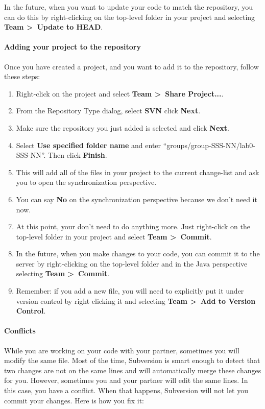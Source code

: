 \documentclass[10pt]{article}
\begin{document}
In the future, when you want to update your code to match the repository, you can do this by right-clicking on the top-level folder in your project and selecting \textbf{Team \textgreater~Update to HEAD}.

\paragraph{Adding your project to the repository} Once you have created a project, and you want to add it to the repository, follow these steps:

\begin{enumerate}
\item Right-click on the project and select \textbf{Team \textgreater~Share Project...}.
\item From the Repository Type dialog, select \textbf{SVN} click \textbf{Next}.
\item Make sure the repository you just added is selected and click \textbf{Next}.
\item Select \textbf{Use specified folder name}	and enter ``groups/group-SSS-NN/lab0-SSS-NN''. Then click \textbf{Finish}. 
\item This will add all of the files in your project to the current change-list and ask you to open the synchronization perspective.
\item You can say \textbf{No} on the synchronization perspective because we don't need it now.
\item At this point, your don't need to do anything more. Just right-click on the top-level folder in your project and select \textbf{Team \textgreater~Commit}.
\item In the future, when you make changes to your code, you can commit it to the server by right-clicking on the top-level folder and in the Java perspective selecting \textbf{Team \textgreater~Commit}.
\item Remember: if you add a new file, you will need to explicitly put it under version control by right clicking it and selecting \textbf{Team \textgreater~Add to Version Control}.
\end{enumerate}

\paragraph{Conflicts} While you are working on your code with your partner, sometimes you will modify the same file. Most of the time, Subversion is smart enough to detect that two changes are not on the same lines and will automatically merge these changes for you. However, sometimes you and your partner will edit the same lines. In this case, you have a conflict. When that happens, Subversion will not let you commit your changes. Here is how you fix it:
\end{document}
